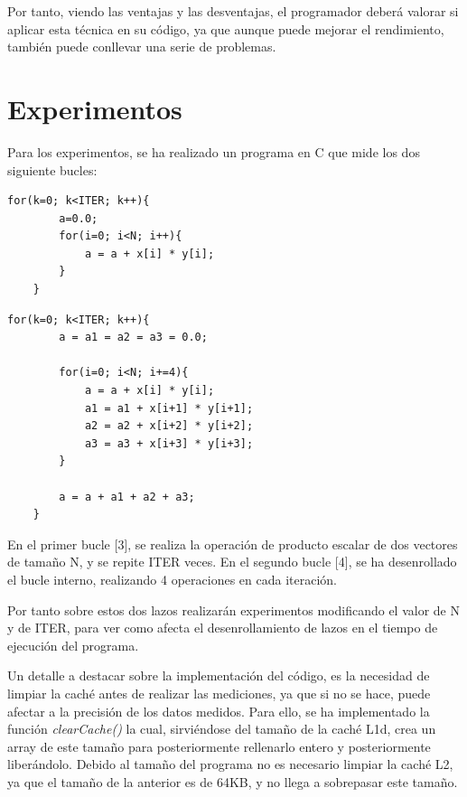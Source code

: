 \documentclass[a4paper,twocolumn]{article}
\begin{document}
Por tanto, viendo las ventajas y las desventajas, el programador deberá valorar si aplicar esta técnica en su código, ya que aunque puede mejorar el rendimiento, también puede conllevar una serie de problemas.

\section{Experimentos}

Para los experimentos, se ha realizado un programa en C que mide los dos siguiente bucles:

\begin{lstlisting}[caption={Bucle sin desenrollar},label={lst:codigoC}]
	for(k=0; k<ITER; k++){
        a=0.0;
        for(i=0; i<N; i++){
            a = a + x[i] * y[i];
        }
    }
\end{lstlisting}

\begin{lstlisting}[caption={Bucle aplicando la técnica},label={lst:codigoC}]
	for(k=0; k<ITER; k++){
        a = a1 = a2 = a3 = 0.0;

        for(i=0; i<N; i+=4){
            a = a + x[i] * y[i];
            a1 = a1 + x[i+1] * y[i+1];
            a2 = a2 + x[i+2] * y[i+2];
            a3 = a3 + x[i+3] * y[i+3];
        }   

        a = a + a1 + a2 + a3;
    } 
\end{lstlisting}

En el primer bucle [3], se realiza la operación de producto escalar de dos vectores de tamaño N, y se repite ITER veces. En el segundo bucle [4], se ha desenrollado el bucle interno, realizando 4 operaciones en cada iteración.

Por tanto sobre estos dos lazos realizarán experimentos modificando el valor de N y de ITER, para ver como afecta el desenrollamiento de lazos en el tiempo de ejecución del programa.

Un detalle a destacar sobre la implementación del código, es la necesidad de limpiar la caché antes de realizar las mediciones, ya que si no se hace, puede afectar a la precisión de los datos medidos. Para ello, se ha implementado la función \textit{clearCache()} la cual, sirviéndose del tamaño de la caché L1d, crea un array de este tamaño para posteriormente rellenarlo entero y posteriormente liberándolo. Debido al tamaño del programa no es necesario limpiar la caché L2, ya que el tamaño de la anterior es de 64KB, y no llega a sobrepasar este tamaño.
\end{document}
